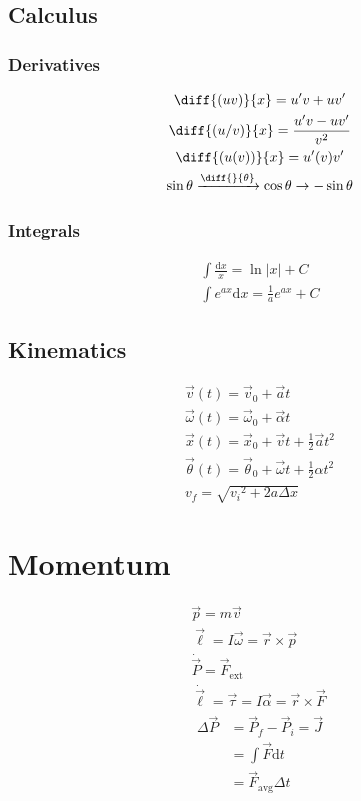 \documentclass[tbtags]{cheatsheet}
\begin{document}
	\subsection{Calculus}
		\subsubsection{Derivatives}
			\begin{gather*}
				\diff{(uv)}{x} = u'v + uv'	\\
				\diff{(u/v)}{x} = \frac{u'v - uv'}{v^2}	\\
				\diff{( u(v) )}{x} = u'(v)v' \\
				\sin\theta \xrightarrow{\diff{}{\theta}} \cos\theta \rightarrow -\sin\theta
			\end{gather*}
		\subsubsection{Integrals}
			\begin{gather*}
				\int \frac{\mathrm{d}x}{x} = \ln|x| + C\\
				\int e^{ax} \mathrm{d}x = \frac{1}{a}e^{ax} + C
			\end{gather*}
	\subsection{Kinematics}
		\begin{gather*}
			\vec v(t) = \vec v_0 + \vec at 	\tag{velocity}\\
			\vec \omega(t) = \vec\omega_0 + \vec\alpha t	\tag{rot. form}\\
			\vec x(t) = \vec x_0 + \vec vt + \frac{1}{2}\vec a t^2	\tag{displacement}\\
			\vec\theta(t) = \vec\theta_0 + \vec\omega t + \frac{1}{2}\alpha t^2	\tag{rot. form}\\
			v_f = \sqrt{{v_i}^2 + 2a\Delta x}	\tag{$v_f$}
		\end{gather*}

	\section{Momentum}
	\begin{gather*}
		\vec p = m\vec v	\tag{momentum}\\
		\vec\ell = I\vec\omega = \vec r \times \vec p	\tag{rot. form}\\
		\dot{\vec P} = \vec F_\mathrm{ext} \tag{2nd law}\\
		\dot{\vec\ell} = \vec\tau = I\vec\alpha= \vec r \times \vec F	\tag{rot. form}\\
		\begin{split}
				\Delta\vec P &= \vec P_f - \vec P_i = \vec J	\\
			&= \int \vec F \mathrm{d}t	\\
			&= \vec F_\text{avg}\Delta t
		\end{split}\tag{impulse}\\
	\end{gather*}
\end{document}
